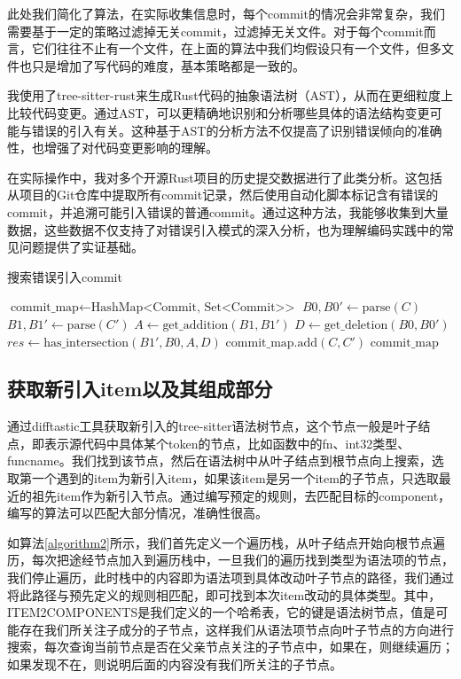 此处我们简化了算法，在实际收集信息时，每个commit的情况会非常复杂，我们需要基于一定的策略过滤掉无关commit，过滤掉无关文件。对于每个commit而言，它们往往不止有一个文件，在上面的算法中我们均假设只有一个文件，但多文件也只是增加了写代码的难度，基本策略都是一致的。

我使用了tree-sitter-rust来生成Rust代码的抽象语法树（AST），从而在更细粒度上比较代码变更。通过AST，可以更精确地识别和分析哪些具体的语法结构变更可能与错误的引入有关。这种基于AST的分析方法不仅提高了识别错误倾向的准确性，也增强了对代码变更影响的理解。

在实际操作中，我对多个开源Rust项目的历史提交数据进行了此类分析。这包括从项目的Git仓库中提取所有commit记录，然后使用自动化脚本标记含有错误的commit，并追溯可能引入错误的普通commit。通过这种方法，我能够收集到大量数据，这些数据不仅支持了对错误引入模式的深入分析，也为理解编码实践中的常见问题提供了实证基础。

\begin{algorithm}
\caption{搜索错误引入commit}
\label{algorithm1}
\begin{algorithmic}[1]
\State $\text{commit\_map} \gets \text{HashMap<Commit, Set<Commit>>}$
    \State $B0, B0' \gets \text{parse}(C)$
        \State $B1, B1' \gets \text{parse}(C')$
        \State $A \gets \text{get_addition}(B1, B1')$
        \State $D \gets \text{get_deletion}(B0, B0')$
        \State $res \gets \text{has\_intersection}(B1', B0, A, D)$
            \State $\text{commit\_map.add}(C, C')$
        \EndIf
    \EndFor
\EndFor
\State \Return $\text{commit\_map}$
\end{algorithmic}
\end{algorithm}

\subsection{获取新引入item以及其组成部分}
通过difftastic工具获取新引入的tree-sitter语法树节点，这个节点一般是叶子结点，即表示源代码中具体某个token的节点，比如函数中的fn、int32类型、funcname。我们找到该节点，然后在语法树中从叶子结点到根节点向上搜索，选取第一个遇到的item为新引入item，如果该item是另一个item的子节点，只选取最近的祖先item作为新引入节点。通过编写预定的规则，去匹配目标的component，编写的算法可以匹配大部分情况，准确性很高。

如算法\ref{algorithm2}所示，我们首先定义一个遍历栈，从叶子结点开始向根节点遍历，每次把途经节点加入到遍历栈中，一旦我们的遍历找到类型为语法项的节点，我们停止遍历，此时栈中的内容即为语法项到具体改动叶子节点的路径，我们通过将此路径与预先定义的规则相匹配，即可找到本次item改动的具体类型。其中，ITEM2COMPONENTS是我们定义的一个哈希表，它的键是语法树节点，值是可能存在我们所关注子成分的子节点，这样我们从语法项节点向叶子节点的方向进行搜索，每次查询当前节点是否在父亲节点关注的子节点中，如果在，则继续遍历；如果发现不在，则说明后面的内容没有我们所关注的子节点。

